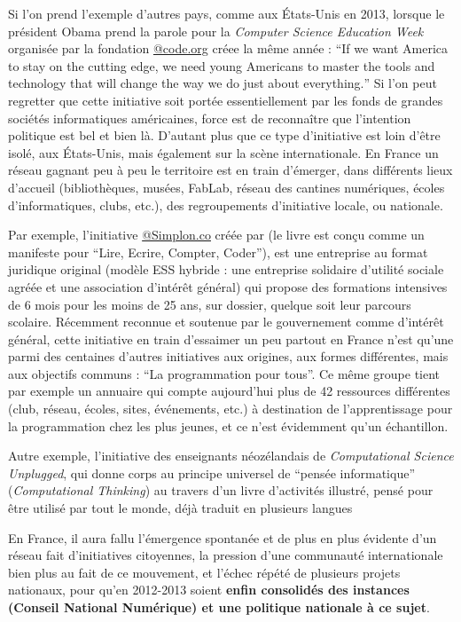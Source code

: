 Si l'on prend l'exemple d'autres pays, comme aux États-Unis en 2013, lorsque le président Obama prend la parole pour la \textit{Computer Science Education Week} organisée par la fondation \href{http://code.org}{@code.org} créee la même année : \foreignquote{english}{If we want America to stay on the cutting edge, we need young Americans to master the tools and technology that will change the way we do just about everything.} Si l'on peut regretter que cette initiative soit portée essentiellement par les fonds de grandes sociétés informatiques américaines, force est de reconnaître que l'intention politique est bel et bien là. D'autant plus que ce type d'initiative est loin d'être isolé, aux États-Unis, mais également sur la scène internationale. En France un réseau gagnant peu à peu le territoire est en train d'émerger, dans différents lieux d'accueil (bibliothèques, musées, FabLab, réseau des cantines numériques, écoles d'informatiques, clubs, etc.), des regroupements d'initiative locale, ou nationale.

Par exemple, l'initiative \href{http://Simplon.co}{@Simplon.co}  créée par \textcite{Bardeau2014} (le livre est conçu comme un manifeste pour \enquote{Lire, Ecrire, Compter, Coder}), est une entreprise au format juridique original (modèle ESS hybride : une entreprise solidaire d’utilité sociale agréée et une association d’intérêt général) qui propose des formations intensives de 6 mois pour les moins de 25 ans, sur dossier, quelque soit leur parcours scolaire. Récemment reconnue et soutenue par le gouvernement comme d'intérêt général, cette initiative en train d'essaimer un peu partout en France n'est qu'une parmi des centaines d'autres initiatives aux origines, aux formes différentes, mais aux objectifs communs : \enquote{La programmation pour tous}. Ce même groupe tient par exemple un annuaire \autocite{Simplon2015} qui compte aujourd'hui plus de 42 ressources différentes (club, réseau, écoles, sites, événements, etc.) à destination de l'apprentissage pour la programmation chez les plus jeunes, et ce n'est évidemment qu'un échantillon.

Autre exemple, l'initiative des enseignants néozélandais de \textit{Computational Science Unplugged}, qui donne corps au principe universel de \enquote{pensée informatique} (\textit{Computational Thinking}) au travers d'un livre d'activités illustré, pensé pour être utilisé par tout le monde, déjà traduit en plusieurs langues 

En France, il aura fallu l'émergence spontanée et de plus en plus évidente d'un réseau fait d'initiatives citoyennes, la pression d'une communauté internationale bien plus au fait de ce mouvement, et l'échec répété de plusieurs projets nationaux, pour qu'en 2012-2013 soient \textbf{ enfin consolidés des instances (Conseil National Numérique) et une politique nationale à ce sujet}.

